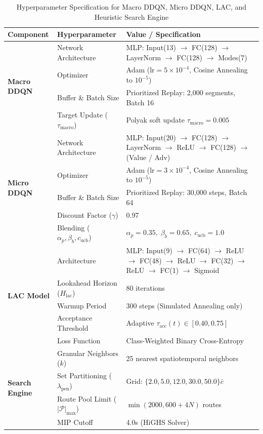 \documentclass{ieeeaccess}
\begin{document}
\begin{table}[!t]
\caption{Hyperparameter Specification for Macro DDQN, Micro DDQN, LAC, and Heuristic Search Engine}
\label{tab:hyperparameters}
\centering
\scriptsize
\renewcommand{\arraystretch}{0.92}
\setlength{\tabcolsep}{2pt}
\begin{tabularx}{\columnwidth}{l l X}
\toprule
\textbf{Component} & \textbf{Hyperparameter} & \textbf{Value / Specification} \\
\midrule
\multirow{4}{*}{\textbf{Macro DDQN}} 
  & Network Architecture & MLP: Input(13) $\to$ FC(128) $\to$ LayerNorm $\to$ FC(128) $\to$ Modes(7) \\
  & Optimizer & Adam ($\text{lr} = 5 \times 10^{-4}$, Cosine Annealing to $10^{-5}$) \\
  & Buffer \& Batch Size & Prioritized Replay: 2,000 segments, Batch 16 \\
  & Target Update ($\tau_{\text{macro}}$) & Polyak soft update $\tau_{\text{macro}} = 0.005$ \\
\midrule
\multirow{5}{*}{\textbf{Micro DDQN}} 
  & Network Architecture & MLP: Input(20) $\to$ FC(128) $\to$ LayerNorm $\to$ ReLU $\to$ FC(128) $\to$ (Value / Adv) \\
  & Optimizer & Adam ($\text{lr} = 3 \times 10^{-4}$, Cosine Annealing to $10^{-5}$) \\
  & Buffer \& Batch Size & Prioritized Replay: 30,000 steps, Batch 64 \\
  & Discount Factor ($\gamma$) & 0.97 \\
  & Blending ($\alpha_p, \beta_b, c_{\text{ucb}}$) & $\alpha_p = 0.35, \; \beta_b = 0.65, \; c_{\text{ucb}} = 1.0$ \\
\midrule
\multirow{5}{*}{\textbf{LAC Model}} 
  & Architecture & MLP: Input(9) $\to$ FC(64) $\to$ ReLU $\to$ FC(48) $\to$ ReLU $\to$ FC(32) $\to$ ReLU $\to$ FC(1) $\to$ Sigmoid \\
  & Lookahead Horizon ($H_{\text{lac}}$) & 80 iterations \\
  & Warmup Period & 300 steps (Simulated Annealing only) \\
  & Acceptance Threshold & Adaptive $\tau_{\text{acc}}(t) \in [0.40, 0.75]$ \\
  & Loss Function & Class-Weighted Binary Cross-Entropy \\
\midrule
\multirow{4}{*}{\textbf{Search Engine}} 
  & Granular Neighbors ($k$) & 25 nearest spatiotemporal neighbors \\
  & Set Partitioning ($\lambda_{\text{pen}}$) & Grid: $\{2.0, 5.0, 12.0, 30.0, 50.0\}\bar{c}$ \\
  & Route Pool Limit ($|\mathcal{P}|_{\max}$) & $\min(2000, 600 + 4N)$ routes \\
  & MIP Cutoff & 4.0s (HiGHS Solver) \\
\bottomrule
\end{tabularx}
\end{table}
\end{document}
